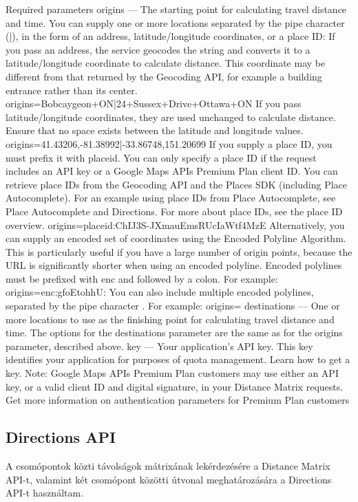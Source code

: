 Required parameters
origins — The starting point for calculating travel distance and time. You can supply one or more locations separated by the pipe character (|), in the form of an address, latitude/longitude coordinates, or a place ID:
If you pass an address, the service geocodes the string and converts it to a latitude/longitude coordinate to calculate distance. This coordinate may be different from that returned by the Geocoding API, for example a building entrance rather than its center.
origins=Bobcaygeon+ON|24+Sussex+Drive+Ottawa+ON
If you pass latitude/longitude coordinates, they are used unchanged to calculate distance. Ensure that no space exists between the latitude and longitude values.
origins=41.43206,-81.38992|-33.86748,151.20699
If you supply a place ID, you must prefix it with placeid. You can only specify a place ID if the request includes an API key or a Google Maps APIs Premium Plan client ID. You can retrieve place IDs from the Geocoding API and the Places SDK (including Place Autocomplete). For an example using place IDs from Place Autocomplete, see Place Autocomplete and Directions. For more about place IDs, see the place ID overview.
origins=placeid:ChIJ3S-JXmauEmsRUcIaWtf4MzE
Alternatively, you can supply an encoded set of coordinates using the Encoded Polyline Algorithm. This is particularly useful if you have a large number of origin points, because the URL is significantly shorter when using an encoded polyline.
Encoded polylines must be prefixed with enc and followed by a colon. For example: origins=enc:gfoEtohhU:
You can also include multiple encoded polylines, separated by the pipe character . For example: origins=
destinations — One or more locations to use as the finishing point for calculating travel distance and time. The options for the destinations parameter are the same as for the origins parameter, described above.
key — Your application's API key. This key identifies your application for purposes of quota management. Learn how to get a key.
Note: Google Maps APIs Premium Plan customers may use either an API key, or a valid client ID and digital signature, in your Distance Matrix requests. Get more information on authentication parameters for Premium Plan customers

\subsection{Directions API}

A csomópontok közti távolságok mátrixának lekérdezésére a Distance Matrix API-t, valamint két csomópont közötti útvonal meghatározására a Directions API-t használtam.

